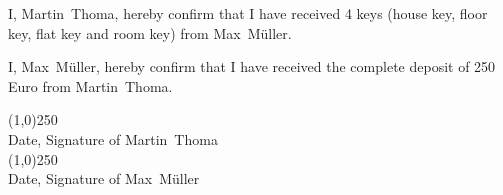 \documentclass[a4paper]{scrartcl}
\newcommand{\HauptmieterVorname}{Martin}                            %
\newcommand{\HauptmieterNachname}{Thoma}                            %
\newcommand{\UntermieterVorname}{Max}                               %
\newcommand{\UntermieterNachname}{Müller}                           %
\begin{document}
I, \HauptmieterVorname~\HauptmieterNachname, hereby confirm that I have received 4 keys (house key,
floor key, flat key and room key) from \UntermieterVorname~\UntermieterNachname.

I, \UntermieterVorname~\UntermieterNachname, hereby confirm that I have received the complete deposit of 250 Euro from \HauptmieterVorname~\HauptmieterNachname.

\vspace{1.5cm}
\line(1,0){250}\\
\vspace{-0.3cm}
{\scriptsize Date, Signature of \HauptmieterVorname~\HauptmieterNachname}\\


\vspace{1cm}
\line(1,0){250}\\
\vspace{-0.3cm}
{\scriptsize Date, Signature of \UntermieterVorname~\UntermieterNachname}\\
\end{document}
